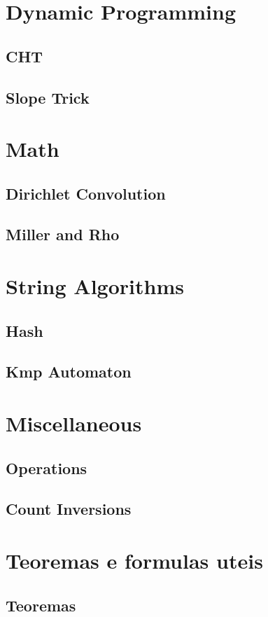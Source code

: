 \section{Dynamic Programming}
\subsection{CHT}
\raggedbottom
\hrulefill
\subsection{Slope Trick}
\raggedbottom
\hrulefill

\section{Math}
\subsection{Dirichlet Convolution}
\raggedbottom
\hrulefill
\subsection{Miller and Rho}
\raggedbottom
\hrulefill

\section{String Algorithms}
\subsection{Hash}
\raggedbottom
\hrulefill
\subsection{Kmp Automaton}
\raggedbottom
\hrulefill

\section{Miscellaneous}
\subsection{Operations}
\raggedbottom
\hrulefill
\subsection{Count Inversions}
\raggedbottom
\hrulefill

\section{Teoremas e formulas uteis}
\subsection{Teoremas}
\raggedbottom
\hrulefill

